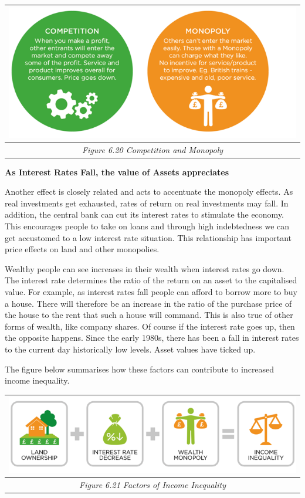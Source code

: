 \documentclass[]{tufte-handout}
\begin{document}
\begin{longtable}[]{@{}c@{}}
\toprule
\includegraphics{OtherPictures/Monopoly.png}\tabularnewline
\midrule
\endhead
\emph{Figure 6.20 Competition and Monopoly}\tabularnewline
\bottomrule
\end{longtable}

\textbf{As Interest Rates Fall, the value of Assets appreciates}

Another effect is closely related and acts to accentuate the monopoly
effects. As real investments get exhausted, rates of return on real
investments may fall. In addition, the central bank can cut its interest
rates to stimulate the economy. This encourages people to take on loans
and through high indebtedness we can get accustomed to a low interest
rate situation. This relationship has important price effects on land
and other monopolies.

Wealthy people can see increases in their wealth when interest rates go
down. The interest rate determines the ratio of the return on an asset
to the capitalised value. For example, as interest rates fall people can
afford to borrow more to buy a house. There will therefore be an
increase in the ratio of the purchase price of the house to the rent
that such a house will command. This is also true of other forms of
wealth, like company shares. Of course if the interest rate goes up,
then the opposite happens. Since the early 1980s, there has been a fall
in interest rates to the current day historically low levels. Asset
values have ticked up.

The figure below summarises how these factors can contribute to
increased income inequality.

\begin{longtable}[]{@{}c@{}}
\toprule
\includegraphics{OtherPictures/FactorsOfIncomeInequality.png}\tabularnewline
\midrule
\endhead
\emph{Figure 6.21 Factors of Income Inequality}\tabularnewline
\bottomrule
\end{longtable}
\end{document}
